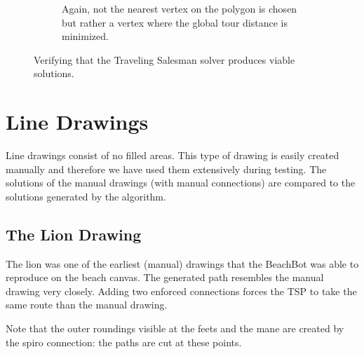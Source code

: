 \begin{figure}
\begin{subfigure}[b]{0.45\textwidth}
\caption{Again, not the nearest vertex on the polygon is chosen but rather a vertex where the global tour distance is minimized.}
\end{subfigure}
\caption{Verifying that the Traveling Salesman solver produces viable solutions.}\label{fig:ver_tsp}
\end{figure}

\clearpage
\section{Line Drawings}

Line drawings consist of no filled areas. This type of drawing is easily created manually and therefore we have used them extensively during testing. The solutions of the manual drawings (with manual connections) are compared to the solutions generated by the algorithm.

\subsection{The Lion Drawing}

The lion was one of the earliest (manual) drawings that the BeachBot was able to reproduce on the beach canvas. The generated path resembles the manual drawing very closely. Adding two enforced connections forces the TSP to take the same route than the manual drawing.

Note that the outer roundings visible at the feets and the mane are created by the spiro connection: the paths are cut at these points.

